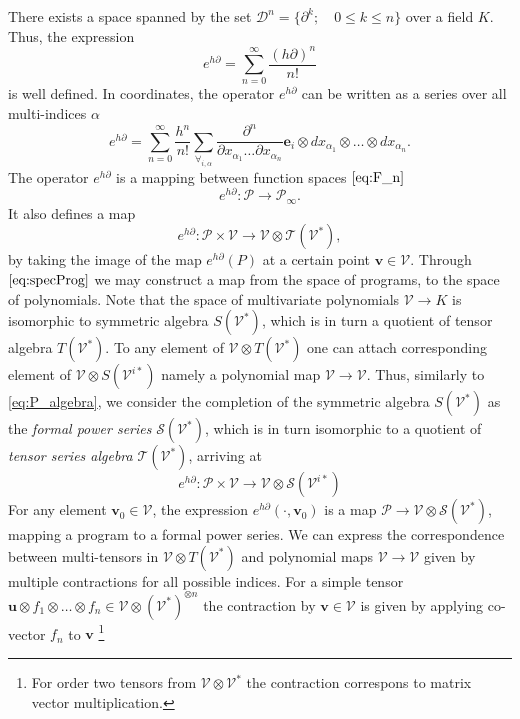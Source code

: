 \documentclass[smallcondensed]{svjour3}
\newcommand{\Ss}{\mathcal{S}}
\newcommand{\T}{\mathcal{T}}
\newcommand{\VV}{\mathcal{V}}
\newcommand{\e}{\mathbf{e}}
\newcommand{\uu}{\mathbf{u}}
\newcommand{\vv}{\mathbf{v}}
\newcommand{\dP}{\mathcal{P}}
\newcommand{\D}{\partial}
\newcommand{\DD}{\mathcal{D}}
\begin{document}
There exists a space spanned by the set $\DD^n=\{\D^k;\quad 0\le k\le n\}$ over a field $K$. Thus, the expression
 \begin{equation}
 	e^{h\D}=\sum\limits_{n=0}^{\infty}\frac{(h\D)^n}{n!}
 \end{equation}
 is well defined. In coordinates, the operator $e^{h\D}$ can be written as a
 series over all multi-indices $\alpha$
 \begin{equation}\label{eq:e^d}
 	e^{h\D}=\sum\limits_{n=0}^{\infty}\frac{h^n}{n!}\sum_{\forall_{i,\alpha}}\frac{\partial^n}{\partial
 		    x_{\alpha_1}\ldots \partial x_{\alpha_n}}\e_i\otimes
 		  dx_{\alpha_1}\otimes\ldots \otimes dx_{\alpha_n}.
 \end{equation}
The operator $e^{h\D}$ is a mapping between function spaces $\eqref{eq:F_n}$
 \begin{equation}
 	e^{h\D}:\dP\to\dP_\infty.
 \end{equation}
 It also defines a map
  \begin{equation}\label{eq:specProg}
  	e^{h\D}:\dP\times \VV\to \VV\otimes \T(\VV^*),
  \end{equation}
by taking the image of the map $e^{h\D}(P)$ at a certain point $\vv\in \VV$.  
Through $\eqref{eq:specProg}$ we may construct a map from the space of programs,
to the space of polynomials. Note that the space of multivariate polynomials
$\VV\to K$ is isomorphic to symmetric algebra $S(\VV^*)$, which is in turn a
quotient of tensor algebra $T(\VV^*)$.
To any element of
 $\VV\otimes T(\VV^*)$ one can attach corresponding element of $\VV\otimes S(\VV^{i*})$
 namely a polynomial map  $\VV\to \VV$. Thus, similarly to \eqref{eq:P_algebra}, we consider the completion of the symmetric algebra $S(\VV^*)$ as the \emph{formal power series} $\Ss(\VV^{*})$, which is in turn isomorphic to a quotient of \emph{tensor series algebra} $\T(\VV^*)$, arriving at 
 \begin{equation}\label{eq:pToPol}
 	e^{h\D}: \dP\times \VV\to \VV\otimes \Ss(\VV^{i*})
 \end{equation}
 For any element $\vv_0\in \VV$, the expression $e^{h\D}(\cdot,\vv_0)$ is a map $\dP\to
 \VV\otimes \Ss(\VV^*)$, mapping a program to a formal power series. We can express the
 correspondence between multi-tensors in $\VV\otimes T(\VV^*)$ and polynomial maps
 $\VV\to \VV$ given by multiple contractions for all possible indices. For a simple tensor $\uu\otimes
 f_1\otimes\ldots\otimes f_n\in \VV\otimes(\VV^*)^{\otimes n}$ the contraction by
 $\vv\in \VV$ is given by applying co-vector $f_n$ to $\vv$ \footnote{For order
   two tensors from $\VV\otimes\VV^*$ the contraction correspons to
matrix vector multiplication.}
\end{document}
